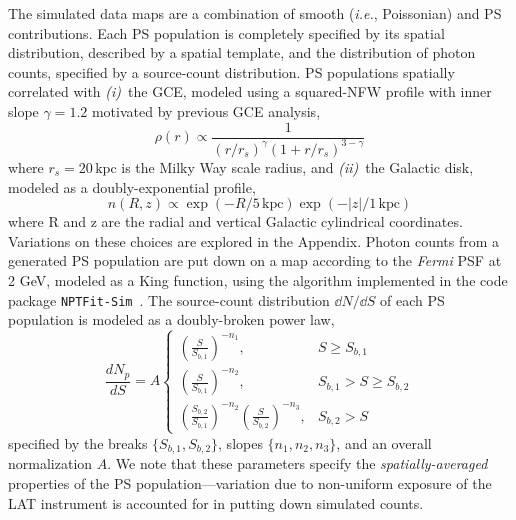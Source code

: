 \documentclass[prd,aps,10pt,nofootinbib,twocolumn,superscriptaddress,preprintnumbers,balancelastpage,longbibliography]{revtex4-1}
\begin{document}
The simulated data maps are a combination of smooth (\emph{i.e.}, Poissonian) and PS contributions. Each PS population is completely specified by its spatial distribution, described by a spatial template, and the distribution of photon counts, specified by a source-count distribution. PS populations spatially correlated with \emph{(i)}~the GCE, modeled using a squared-NFW profile with inner slope $\gamma=1.2$ motivated by previous GCE analysis,
\begin{equation}
    \rho(r) \propto \frac{1}{\left(r / r_{s}\right)^{\gamma}\left(1+r / r_{s}\right)^{3-\gamma}}
\end{equation}
where $r_{s}=20\,\mathrm{kpc}$ is the Milky Way scale radius, and \emph{(ii)}~the Galactic disk, modeled as a doubly-exponential profile,
\begin{equation}
    n(R, z) \propto \exp (-R / 5\,\mathrm{kpc}) \exp (-|z| / 1\,\mathrm{kpc})
\end{equation}
where R and z are the radial and vertical Galactic cylindrical coordinates. Variations on these choices are explored in the Appendix. Photon counts from a generated PS population are put down on a map according to the \emph{Fermi} PSF at 2 GeV, modeled as a King function, using the algorithm implemented in the code package \texttt{NPTFit-Sim}~\cite{NPTFit-Sim}. The source-count distribution $\dd N /\dd S$ of each PS population is modeled as a doubly-broken power law,
\begin{equation}
    \frac{d N_{p}}{d S}=A\left\{\begin{array}{lc}
        \left(\frac{S}{S_{b, 1}}\right)^{-n_{1}}, & S \geq S_{b, 1} \\
        \left(\frac{S}{S_{b, 1}}\right)^{-n_{2}}, & S_{b, 1}>S \geq S_{b, 2} \\
        \left(\frac{S_{b, 2}}{S_{b, 1}}\right)^{-n_{2}}\left(\frac{S}{S_{b, 2}}\right)^{-n_{3}}, & S_{b, 2}>S
        \end{array}\right.
\end{equation}
specified by the breaks $\{S_{b, 1}, S_{b, 2}\}$, slopes $\{n_1, n_2, n_3\}$, and an overall normalization $A$. We note that these parameters specify the \emph{spatially-averaged} properties of the PS population---variation due to non-uniform exposure of the LAT instrument is accounted for in putting down simulated counts.
\end{document}
